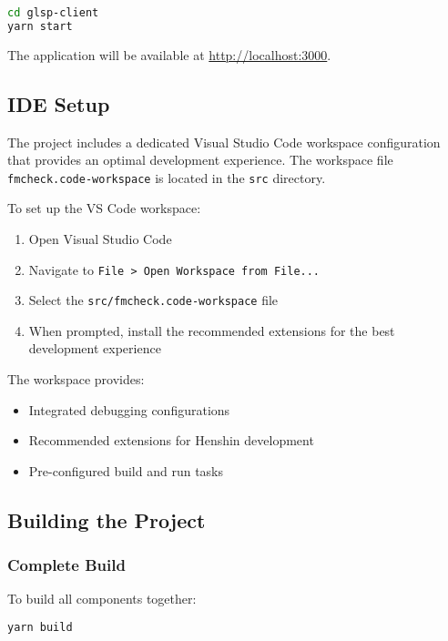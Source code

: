 \begin{lstlisting}[language=bash]
cd glsp-client
yarn start
\end{lstlisting}

The application will be available at \url{http://localhost:3000}.

\subsection{IDE Setup}
\label{subsec:ide_setup}

The project includes a dedicated Visual Studio Code workspace configuration that provides an optimal development experience. The workspace file \texttt{fmcheck.code-workspace} is located in the \texttt{src} directory.

To set up the VS Code workspace:

\begin{enumerate}
    \item Open Visual Studio Code
    \item Navigate to \texttt{File > Open Workspace from File...}
    \item Select the \texttt{src/fmcheck.code-workspace} file
    \item When prompted, install the recommended extensions for the best development experience
\end{enumerate}

The workspace provides:
\begin{itemize}
    \item Integrated debugging configurations
    \item Recommended extensions for Henshin development
    \item Pre-configured build and run tasks
\end{itemize}

\subsection{Building the Project}
\label{subsec:building}

\subsubsection{Complete Build}

To build all components together:

\begin{lstlisting}[language=bash]
yarn build
\end{lstlisting}

